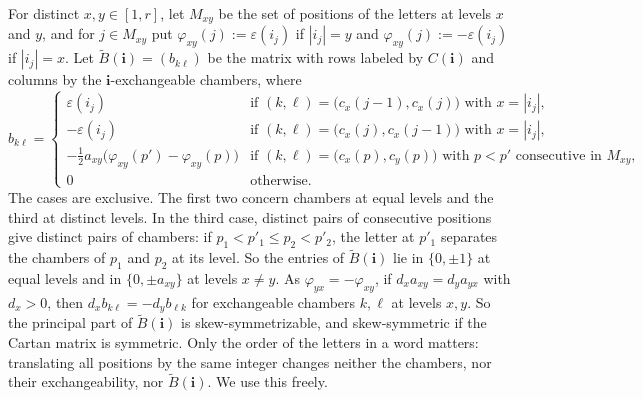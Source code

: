 \documentclass[a4paper]{amsart}
\numberwithin{equation}{section}
\theoremstyle{definition}
\theoremstyle{remark}
\newcommand{\bfi}{\mathbf{i}}
\newcommand{\tB}{\widetilde{B}}
\begin{document}
For distinct $x,y\in[1,r]$, let $M_{xy}$ be the set of positions of the letters at levels $x$ and $y$, and for $j\in M_{xy}$ put $\varphi_{xy}(j):=\varepsilon(i_j)$ if $|i_j|=y$ and $\varphi_{xy}(j):=-\varepsilon(i_j)$ if $|i_j|=x$.
Let $\tB(\bfi)=(b_{k\ell})$ be the matrix with rows labeled by $C(\bfi)$ and columns by the $\bfi$-exchangeable chambers, where
\begin{equation}
  \label{eq: B entries}
  b_{k\ell}=
  \begin{cases}
    \varepsilon(i_j) & \text{if } (k,\ell)=\big(c_x(j-1),c_x(j)\big) \text{ with } x=|i_j|,\\
    -\varepsilon(i_j) & \text{if } (k,\ell)=\big(c_x(j),c_x(j-1)\big) \text{ with } x=|i_j|,\\
    -\frac12a_{xy}\big(\varphi_{xy}(p')-\varphi_{xy}(p)\big) & \text{if } (k,\ell)=\big(c_x(p),c_y(p)\big) \text{ with } p<p' \text{ consecutive in } M_{xy},\\
    0 & \text{otherwise.}
  \end{cases}
\end{equation}
The cases are exclusive.
The first two concern chambers at equal levels and the third at distinct levels.
In the third case, distinct pairs of consecutive positions give distinct pairs of chambers: if $p_1<p'_1\le p_2<p'_2$, the letter at $p'_1$ separates the chambers of $p_1$ and $p_2$ at its level.
So the entries of $\tB(\bfi)$ lie in $\{0,\pm1\}$ at equal levels and in $\{0,\pm a_{xy}\}$ at levels $x\neq y$.
As $\varphi_{yx}=-\varphi_{xy}$, if $d_xa_{xy}=d_ya_{yx}$ with $d_x>0$, then $d_xb_{k\ell}=-d_yb_{\ell k}$ for exchangeable chambers $k,\ell$ at levels $x,y$.
So the principal part of $\tB(\bfi)$ is skew-symmetrizable, and skew-symmetric if the Cartan matrix is symmetric.
Only the order of the letters in a word matters: translating all positions by the same integer changes neither the chambers, nor their exchangeability, nor $\tB(\bfi)$.
We use this freely.
\end{document}
